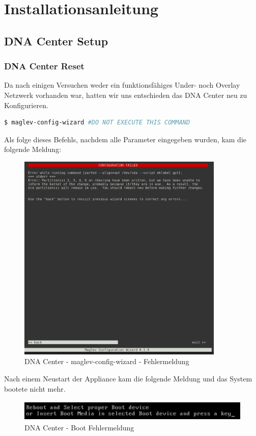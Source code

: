 \section{Installationsanleitung}

\subsection{DNA Center Setup}



\subsubsection{DNA Center Reset}
Da nach einigen Versuchen weder ein funktionsfähiges Under- noch Overlay Netzwerk vorhanden war, hatten wir uns entschieden das DNA Center neu zu Konfigurieren.

\begin{lstlisting}[language=bash]
$ maglev-config-wizard #DO NOT EXECUTE THIS COMMAND
\end{lstlisting}

Als folge dieses Befehls, nachdem alle Parameter eingegeben wurden, kam die folgende Meldung:

\begin{figure}[H]
	\centering
	\includegraphics[height=10cm]{img/dna-center-reset-fail-1.png}
	\caption{DNA Center - maglev-config-wizard - Fehlermeldung}
	\label{fig:dna-center-reset-1}
\end{figure}

Nach einem Neustart der Appliance kam die folgende Meldung und das System bootete nicht mehr. 
\begin{figure}[H]
	\centering
	\includegraphics[height=1cm]{img/dna-center-reset-fail-2.png}
	\caption{DNA Center - Boot Fehlermeldung}
	\label{fig:dna-center-reset-2}
\end{figure}

